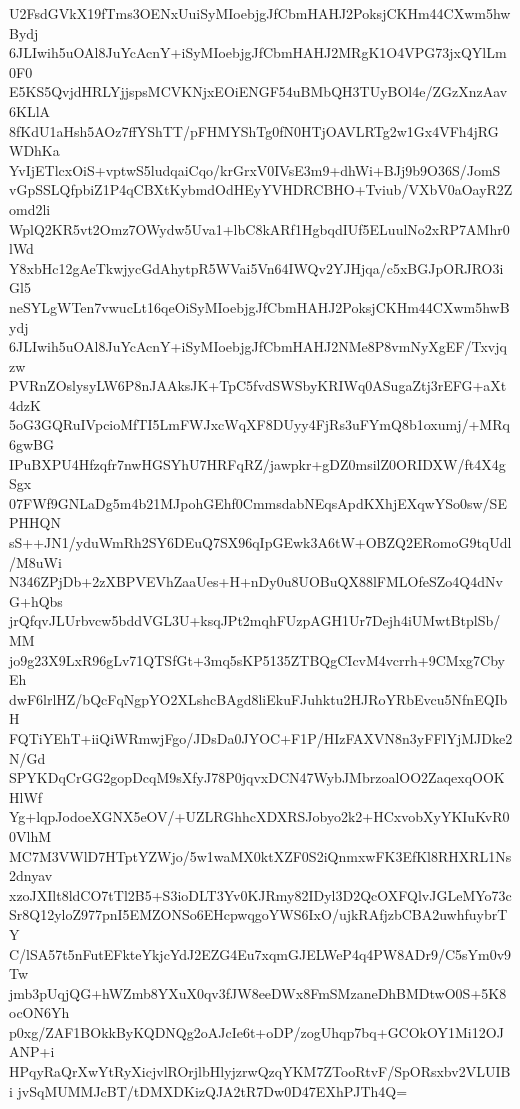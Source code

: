 U2FsdGVkX19fTms3OENxUuiSyMIoebjgJfCbmHAHJ2PoksjCKHm44CXwm5hwBydj
6JLIwih5uOAl8JuYcAcnY+iSyMIoebjgJfCbmHAHJ2MRgK1O4VPG73jxQYlLm0F0
E5KS5QvjdHRLYjjspsMCVKNjxEOiENGF54uBMbQH3TUyBOl4e/ZGzXnzAav6KLlA
8fKdU1aHsh5AOz7ffYShTT/pFHMYShTg0fN0HTjOAVLRTg2w1Gx4VFh4jRGWDhKa
YvIjETlcxOiS+vptwS5ludqaiCqo/krGrxV0IVsE3m9+dhWi+BJj9b9O36S/JomS
vGpSSLQfpbiZ1P4qCBXtKybmdOdHEyYVHDRCBHO+Tviub/VXbV0aOayR2Zomd2li
WplQ2KR5vt2Omz7OWydw5Uva1+lbC8kARf1HgbqdIUf5ELuulNo2xRP7AMhr0lWd
Y8xbHc12gAeTkwjycGdAhytpR5WVai5Vn64IWQv2YJHjqa/c5xBGJpORJRO3iGl5
neSYLgWTen7vwucLt16qeOiSyMIoebjgJfCbmHAHJ2PoksjCKHm44CXwm5hwBydj
6JLIwih5uOAl8JuYcAcnY+iSyMIoebjgJfCbmHAHJ2NMe8P8vmNyXgEF/Txvjqzw
PVRnZOslysyLW6P8nJAAksJK+TpC5fvdSWSbyKRIWq0ASugaZtj3rEFG+aXt4dzK
5oG3GQRuIVpcioMfTI5LmFWJxcWqXF8DUyy4FjRs3uFYmQ8b1oxumj/+MRq6gwBG
IPuBXPU4Hfzqfr7nwHGSYhU7HRFqRZ/jawpkr+gDZ0msilZ0ORIDXW/ft4X4gSgx
07FWf9GNLaDg5m4b21MJpohGEhf0CmmsdabNEqsApdKXhjEXqwYSo0sw/SEPHHQN
sS++JN1/yduWmRh2SY6DEuQ7SX96qIpGEwk3A6tW+OBZQ2ERomoG9tqUdl/M8uWi
N346ZPjDb+2zXBPVEVhZaaUes+H+nDy0u8UOBuQX88lFMLOfeSZo4Q4dNvG+hQbs
jrQfqvJLUrbvcw5bddVGL3U+ksqJPt2mqhFUzpAGH1Ur7Dejh4iUMwtBtplSb/MM
jo9g23X9LxR96gLv71QTSfGt+3mq5sKP5135ZTBQgCIcvM4vcrrh+9CMxg7CbyEh
dwF6lrlHZ/bQcFqNgpYO2XLshcBAgd8liEkuFJuhktu2HJRoYRbEvcu5NfnEQIbH
FQTiYEhT+iiQiWRmwjFgo/JDsDa0JYOC+F1P/HIzFAXVN8n3yFFlYjMJDke2N/Gd
SPYKDqCrGG2gopDcqM9sXfyJ78P0jqvxDCN47WybJMbrzoalOO2ZaqexqOOKHlWf
Yg+lqpJodoeXGNX5eOV/+UZLRGhhcXDXRSJobyo2k2+HCxvobXyYKIuKvR00VlhM
MC7M3VWlD7HTptYZWjo/5w1waMX0ktXZF0S2iQnmxwFK3EfKl8RHXRL1Ns2dnyav
xzoJXIlt8ldCO7tTl2B5+S3ioDLT3Yv0KJRmy82IDyl3D2QcOXFQlvJGLeMYo73c
Sr8Q12yloZ977pnI5EMZONSo6EHcpwqgoYWS6IxO/ujkRAfjzbCBA2uwhfuybrTY
C/lSA57t5nFutEFkteYkjcYdJ2EZG4Eu7xqmGJELWeP4q4PW8ADr9/C5sYm0v9Tw
jmb3pUqjQG+hWZmb8YXuX0qv3fJW8eeDWx8FmSMzaneDhBMDtwO0S+5K8ocON6Yh
p0xg/ZAF1BOkkByKQDNQg2oAJcIe6t+oDP/zogUhqp7bq+GCOkOY1Mi12OJANP+i
HPqyRaQrXwYtRyXicjvlROrjlbHlyjzrwQzqYKM7ZTooRtvF/SpORsxbv2VLUIBi
jvSqMUMMJcBT/tDMXDKizQJA2tR7Dw0D47EXhPJTh4Q=

